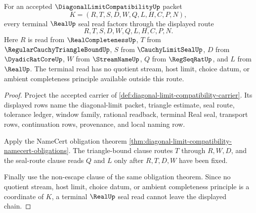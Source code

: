 \begin{theorem}
\label{thm:diagonal-limit-compatibility-terminal-real-route}
For an accepted $\DiagonalLimitCompatibilityUp$ packet
$$
K=(R,T,S,D,W,Q,L,H,C,P,N),
$$
every terminal $\RealUp$ seal read factors through the displayed route
$$
R,T,S,D,W,Q,L,H,C,P,N.
$$
Here $R$ is read from $\RealCompletenessUp$, $T$ from $\RegularCauchyTriangleBoundUp$, $S$ from $\CauchyLimitSealUp$, $D$ from $\DyadicRatCoreUp$, $W$ from $\StreamNameUp$, $Q$ from $\RegSeqRatUp$, and $L$ from $\RealUp$. The terminal read has no quotient stream, host limit, choice datum, or ambient completeness principle available outside this route.
\end{theorem}
\begin{proof}
Project the accepted carrier of \autoref{def:diagonal-limit-compatibility-carrier}. Its displayed rows name the diagonal-limit packet, triangle estimate, seal route, tolerance ledger, window family, rational readback, terminal Real seal, transport rows, continuation rows, provenance, and local naming row.

Apply the NameCert obligation theorem \autoref{thm:diagonal-limit-compatibility-namecert-obligations}. The triangle-bound clause routes $T$ through $R,W,D$, and the seal-route clause reads $Q$ and $L$ only after $R,T,D,W$ have been fixed.

Finally use the non-escape clause of the same obligation theorem. Since no quotient stream, host limit, choice datum, or ambient completeness principle is a coordinate of $K$, a terminal $\RealUp$ seal read cannot leave the displayed chain.
\end{proof}


